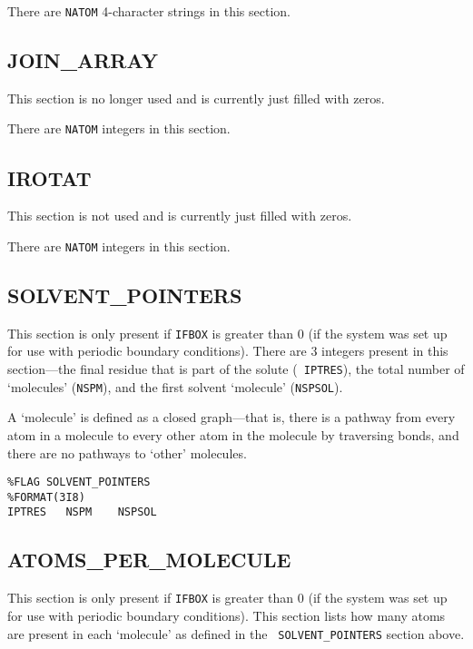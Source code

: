 
\noindent There are {\tt NATOM} 4-character strings in this section.

\subsection*{JOIN\_ARRAY}

This section is no longer used and is currently just filled with zeros.


\noindent There are {\tt NATOM} integers in this section.

\subsection*{IROTAT}

This section is not used and is currently just filled with zeros.


\noindent There are {\tt NATOM} integers in this section.

\subsection*{SOLVENT\_POINTERS}

This section is only present if {\tt IFBOX} is greater than 0 (\ie if the system
was set up for use with periodic boundary conditions). There are 3 integers
present in this section---the final residue that is part of the solute ({\tt
IPTRES}), the total number of `molecules' ({\tt NSPM}), and the first solvent
`molecule' ({\tt NSPSOL}).

A `molecule' is defined as a closed graph---that is, there is a pathway from
every atom in a molecule to every other atom in the molecule by traversing
bonds, and there are no pathways to `other' molecules.

\begin{verbatim}
%FLAG SOLVENT_POINTERS
%FORMAT(3I8)
IPTRES   NSPM    NSPSOL
\end{verbatim}

\subsection*{ATOMS\_PER\_MOLECULE}

This section is only present if {\tt IFBOX} is greater than 0 (\ie if the system
was set up for use with periodic boundary conditions). This section lists how
many atoms are present in each `molecule' as defined in the {\tt
SOLVENT\_POINTERS} section above.

